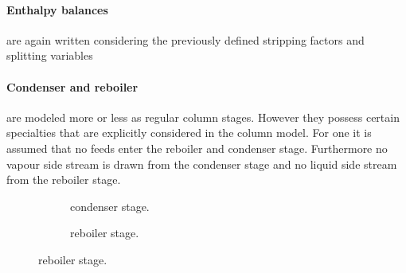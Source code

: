         \paragraph{Enthalpy balances} are again written considering the previously defined stripping factors
        and splitting variables

        \paragraph{Condenser and reboiler} are modeled more or less as regular column stages. However they possess
        certain specialties that are explicitly considered in the column model. For one it is assumed
        that no feeds enter the reboiler and condenser stage. Furthermore no vapour side stream is
        drawn from the condenser stage and no liquid side stream from the reboiler stage.

        \begin{figure}
            \centering
            \begin{subfigure}{0.45\textwidth}
                \centering
                
                \caption{condenser stage.}
                \label{fig:col_condenser}
            \end{subfigure}
            \begin{subfigure}{0.45\textwidth}
                \centering
                
                \caption{reboiler stage.}
                \label{fig:col_reboiler}
            \end{subfigure}
        \end{figure}

